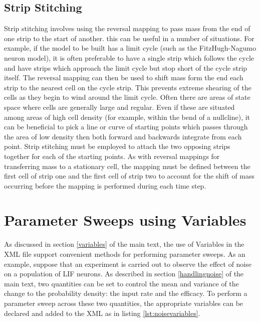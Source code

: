 \documentclass[utf8]{frontiers_suppmat} %
\begin{document}
\subsection{Strip Stitching}
Strip stitching involves using the reversal mapping to pass mass from the end of one strip to the start of another. this can be useful in a number of situations. For example, if the model to be built has a limit cycle (such as the FitzHugh-Nagumo neuron model), it is often preferable to have a single strip which follows the cycle and have strips which approach the limit cycle but stop short of the cycle strip itself. The reversal mapping can then be used to shift mass form the end each strip to the nearest cell on the cycle strip. This prevents extreme shearing of the cells as they begin to wind around the limit cycle. 
Often there are areas of state space where cells are generally large and regular. Even if these are situated among areas of high cell density (for example, within the bend of a nullcline), it can be beneficial to pick a line or curve of starting points which passes through the area of low density then both forward and backwards integrate from each point. Strip stitching must be employed to attach the two opposing strips together for each of the starting points. 
As with reversal mappings for transferring mass to a stationary cell, the mapping must be defined between the first cell of strip one and the first cell of strip two to account for the shift of mass occurring before the mapping is performed during each time step.

\section{Parameter Sweeps using Variables}
\label{parametersweeps}
As discussed in section \ref{variables} of the main text, the use of Variables in the XML file support convenient methods for performing parameter sweeps. As an example, suppose that an experiment is carried out to observe the effect of noise on a population of LIF neurons. As described in section \ref{handlingnoise} of the main text, two quantities can be set to control the mean and variance of the change to the probability density: the input rate and the efficacy. To perform a parameter sweep across these two quantities, the appropriate variables can be declared and added to the XML as in listing \ref{lst:noisevariables}.
\end{document}
